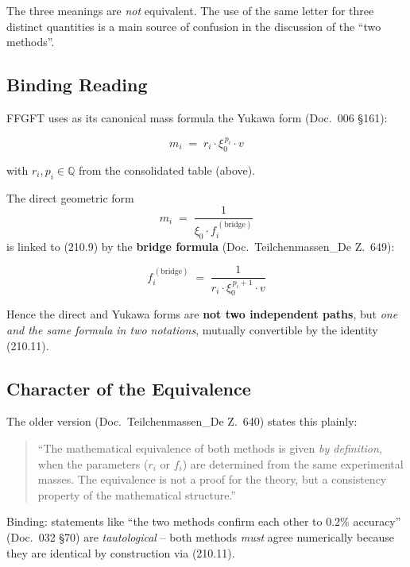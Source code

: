 The three meanings are \emph{not} equivalent. The use of the same
letter for three distinct quantities is a main source of confusion
in the discussion of the \enquote{two methods}.

\subsection*{Binding Reading}

FFGFT uses as its canonical mass formula the Yukawa form
(Doc.~006 §161):

\begin{equation}
  \boxed{\;m_i \;=\; r_i \cdot \xi_0^{\,p_i} \cdot v\;}
  \tag{210.9}
\end{equation}

with $r_i, p_i \in \mathbb{Q}$ from the consolidated table (above).

The direct geometric form
\begin{equation}
  m_i \;=\; \frac{1}{\xi_0 \cdot f_i^{\,(\text{bridge})}}
  \tag{210.10}
\end{equation}
is linked to (210.9) by the \textbf{bridge formula}
(Doc.~Teilchenmassen\_De Z.~649):

\begin{equation}
  \boxed{\;f_i^{\,(\text{bridge})}
  \;=\; \frac{1}{r_i \cdot \xi_0^{\,p_i+1} \cdot v}\;}
  \tag{210.11}
\end{equation}

Hence the direct and Yukawa forms are \textbf{not two independent
paths}, but \emph{one and the same formula in two notations},
mutually convertible by the identity (210.11).

\subsection*{Character of the Equivalence}

The older version (Doc.~Teilchenmassen\_De Z.~640) states this
plainly:

\begin{quote}
\enquote{The mathematical equivalence of both methods is given
\emph{by definition}, when the parameters ($r_i$ or $f_i$) are
determined from the same experimental masses. The equivalence is
not a proof for the theory, but a consistency property of the
mathematical structure.}
\end{quote}

Binding: statements like \enquote{the two methods confirm each other
to $0.2\%$ accuracy} (Doc.~032 §70) are \emph{tautological} -- both
methods \emph{must} agree numerically because they are identical by
construction via (210.11).

